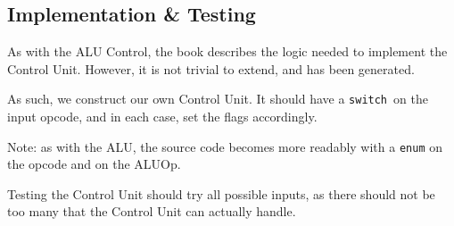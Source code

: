 \documentclass{beamer}
\begin{document}
\subsection{Implementation \& Testing}
\begin{frame}
    As with the ALU Control, the book describes the logic needed to implement
    the Control Unit. However, it is not trivial to extend, and has been
    generated.

    \vspace{\baselineskip}
    As such, we construct our own Control Unit. It should have a
    \texttt{switch} on the input opcode, and in each case, set the flags
    accordingly.

    \vspace{\baselineskip}
    Note: as with the ALU, the source code becomes more readably with a
    \texttt{enum} on the opcode and on the ALUOp.

    \vspace{\baselineskip}
    Testing the Control Unit should try all possible inputs, as there should
    not be too many that the Control Unit can actually handle.
\end{frame}
\end{document}

